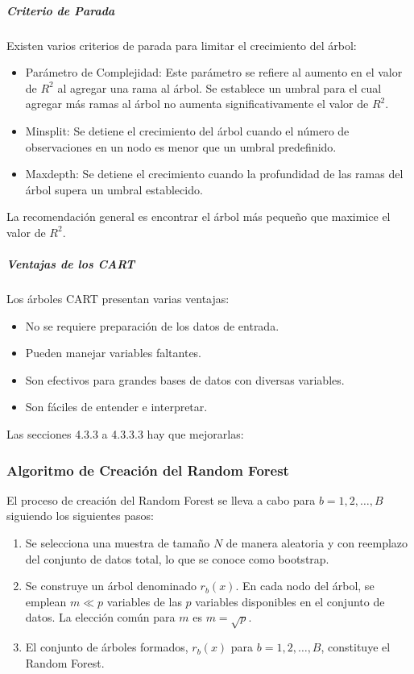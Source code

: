\subparagraph{Criterio de Parada}
Existen varios criterios de parada para limitar el crecimiento del árbol:
\begin{itemize}
	\item Parámetro de Complejidad: Este parámetro se refiere al aumento en el valor de \(R^2\) al agregar una rama al árbol. Se establece un umbral para el cual agregar más ramas al árbol no aumenta significativamente el valor de \(R^2\).
	\item Minsplit: Se detiene el crecimiento del árbol cuando el número de observaciones en un nodo es menor que un umbral predefinido.
	\item Maxdepth: Se detiene el crecimiento cuando la profundidad de las ramas del árbol supera un umbral establecido.
\end{itemize}
La recomendación general es encontrar el árbol más pequeño que maximice el valor de \(R^2\).

\subparagraph{Ventajas de los CART}
Los árboles CART presentan varias ventajas:
\begin{itemize}
	\item No se requiere preparación de los datos de entrada.
	\item Pueden manejar variables faltantes.
	\item Son efectivos para grandes bases de datos con diversas variables.
	\item Son fáciles de entender e interpretar.
\end{itemize}

{\color{blue} Las secciones 4.3.3 a 4.3.3.3 hay que mejorarlas:}

\subsubsection{Algoritmo de Creación del Random Forest}

El proceso de creación del Random Forest se lleva a cabo para \(b = 1,2, \ldots, B\) siguiendo los siguientes pasos:
\begin{enumerate}
  \item Se selecciona una muestra de tamaño \(N\) de manera aleatoria y con reemplazo del conjunto de datos total, lo que se conoce como bootstrap.
  \item Se construye un árbol denominado \(r_b(x)\). En cada nodo del árbol, se emplean \(m \ll p\) variables de las \(p\) variables disponibles en el conjunto de datos. La elección común para \(m\) es \(m = \sqrt{p}\).
  \item El conjunto de árboles formados, \(r_b(x)\) para \(b = 1,2, \ldots, B\), constituye el Random Forest.
\end{enumerate}

